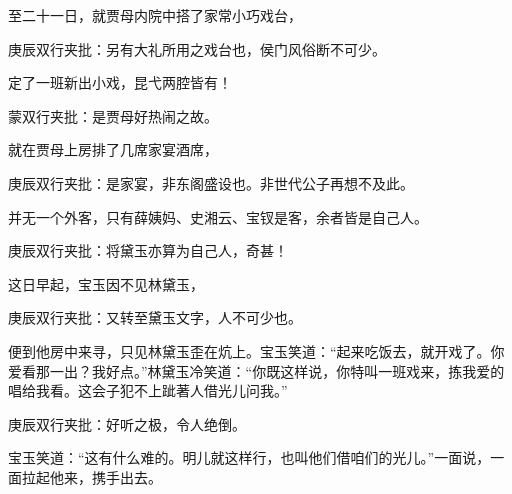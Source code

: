 \begin{parag}


    至二十一日，就贾母内院中搭了家常小巧戏台，\begin{note}庚辰双行夹批：另有大礼所用之戏台也，侯门风俗断不可少。\end{note}定了一班新出小戏，昆弋两腔皆有！\begin{note}蒙双行夹批：是贾母好热闹之故。\end{note}就在贾母上房排了几席家宴酒席，\begin{note}庚辰双行夹批：是家宴，非东阁盛设也。非世代公子再想不及此。\end{note}并无一个外客，只有薛姨妈、史湘云、宝钗是客，余者皆是自己人。\begin{note}庚辰双行夹批：将黛玉亦算为自己人，奇甚！\end{note}这日早起，宝玉因不见林黛玉，\begin{note}庚辰双行夹批：又转至黛玉文字，人不可少也。\end{note}便到他房中来寻，只见林黛玉歪在炕上。宝玉笑道：“起来吃饭去，就开戏了。你爱看那一出？我好点。”林黛玉冷笑道：“你既这样说，你特叫一班戏来，拣我爱的唱给我看。这会子犯不上跐著人借光儿问我。”\begin{note}庚辰双行夹批：好听之极，令人绝倒。\end{note}宝玉笑道：“这有什么难的。明儿就这样行，也叫他们借咱们的光儿。”一面说，一面拉起他来，携手出去。
\end{parag}


